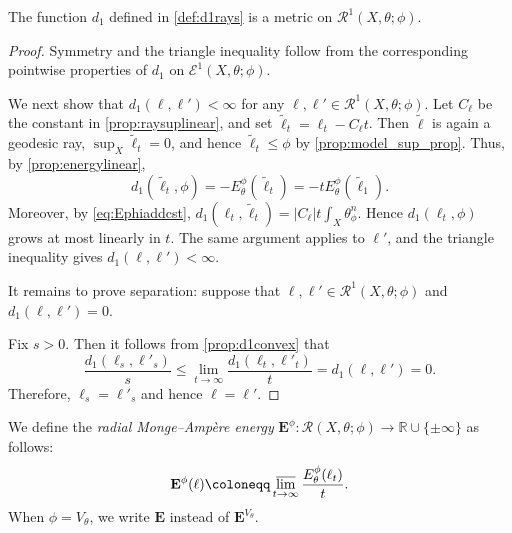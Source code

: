 \begin{theorem}\label{thm:d1raycomplete}
    The function $d_1$ defined in \cref{def:d1rays} is a metric on $\mathcal{R}^1(X,\theta;\phi)$.
\end{theorem}
\begin{proof}
    Symmetry and the triangle inequality follow from the corresponding pointwise properties of $d_1$ on $\mathcal{E}^1(X,\theta;\phi)$.

    We next show that $d_1(\ell,\ell')<\infty$ for any $\ell,\ell'\in \mathcal{R}^1(X,\theta;\phi)$. Let $C_\ell$ be the constant in \cref{prop:raysuplinear}, and set $\tilde{\ell}_t=\ell_t-C_\ell t$. Then $\tilde{\ell}$ is again a geodesic ray, $\sup_X\tilde{\ell}_t=0$, and hence $\tilde{\ell}_t\leq \phi$ by \cref{prop:model_sup_prop}. Thus, by \cref{prop:energylinear},
    \[
    d_1(\tilde{\ell}_t,\phi)=-E_\theta^\phi(\tilde{\ell}_t)=-tE_\theta^\phi(\tilde{\ell}_1).
    \]
    Moreover, by \eqref{eq:Ephiaddcst}, $d_1(\ell_t,\tilde{\ell}_t)=|C_\ell|t\int_X\theta_{\phi}^n$. Hence $d_1(\ell_t,\phi)$ grows at most linearly in $t$. The same argument applies to $\ell'$, and the triangle inequality gives $d_1(\ell,\ell')<\infty$.

It remains to prove separation: suppose that $\ell,\ell'\in \mathcal{R}^1(X,\theta;\phi)$ and $d_1(\ell,\ell')=0$.

    Fix $s>0$. Then it follows from \cref{prop:d1convex} that
    \[
    \frac{d_1(\ell_s,\ell'_s)}{s}\leq \lim_{t\to\infty}\frac{d_1(\ell_t,\ell'_t)}{t}=d_1(\ell,\ell')=0.
    \]
    Therefore, $\ell_s=\ell'_s$ and hence $\ell=\ell'$.
\end{proof}


\begin{definition}\label{def:radialMAenergy2}
    We define the \emph{radial Monge--Amp\`ere energy} $\mathbf{E}^{\phi}\colon \mathcal{R}(X,\theta;\phi)\rightarrow \mathbb{R}\cup \{\pm\infty\}$ as follows:
    \[
    \mathbf{E}^{\phi}(\ell)\coloneqq \varlimsup_{t\to\infty}\frac{E_{\theta}^{\phi}(\ell_t)}{t}.
    \]
    When $\phi=V_{\theta}$, we write $\mathbf{E}$ instead of $\mathbf{E}^{V_{\theta}}$.
\end{definition}

